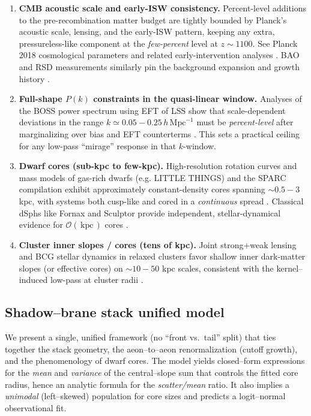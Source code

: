 \documentclass[10pt]{article}
\theoremstyle{definition}
\theoremstyle{plain}
\begin{document}
\begin{enumerate}[leftmargin=1.4em,itemsep=2pt]
\item \textbf{CMB acoustic scale and early-ISW consistency.}
Percent-level additions to the pre-recombination matter budget are tightly bounded by
Planck’s acoustic scale, lensing, and the early-ISW pattern, keeping any extra,
pressureless-like component at the \emph{few-percent} level at $z\!\sim\!1100$.
See Planck 2018 cosmological parameters \cite{Planck2018} and related early-intervention
analyses \cite{Poulin2019,Hill2020}. BAO and RSD measurements similarly pin the background
expansion and growth history \cite{Alam2021eBOSS}.

\item \textbf{Full-shape $P(k)$ constraints in the quasi-linear window.}
Analyses of the BOSS power spectrum using EFT of LSS show that
scale-dependent deviations in the range $k\simeq 0.05{-}0.25\,h\,\mathrm{Mpc}^{-1}$ must
be \emph{percent-level} after marginalizing over bias and EFT counterterms
\cite{Ivanov2020,DAmico2020}. This sets a practical ceiling for any low-pass “mirage”
response in that $k$-window.

\item \textbf{Dwarf cores (sub-kpc to few-kpc).}
High-resolution rotation curves and mass models of gas-rich dwarfs (e.g. LITTLE THINGS)
and the SPARC compilation exhibit approximately constant-density cores spanning
$\sim\!0.5{-}3$ kpc, with systems both cusp-like and cored in a \emph{continuous} spread
\cite{Oh2015,Lelli2016SPARC,Read2019}. Classical dSphs like Fornax and Sculptor provide
independent, stellar-dynamical evidence for $\mathcal{O}(\,\mathrm{kpc}\,)$ cores
\cite{WalkerPenarrubia2011}.

\item \textbf{Cluster inner slopes / cores (tens of kpc).}
Joint strong+weak lensing and BCG stellar dynamics in relaxed clusters favor shallow inner
dark-matter slopes (or effective cores) on $\sim\!10{-}50$ kpc scales, consistent with the
kernel–induced low-pass at cluster radii \cite{Newman2013I,Newman2013II}.
\end{enumerate}

\subsection{Shadow–brane stack unified model}
\label{subsec:stack-fit-unified}

We present a single, unified framework (no ``front vs.\ tail'' split) that ties together the stack geometry, the aeon–to–aeon renormalization (cutoff growth), and the phenomenology of dwarf cores. The model yields closed–form expressions for the \emph{mean} and \emph{variance} of the central–slope sum that controls the fitted core radius, hence an analytic formula for the \emph{scatter/mean} ratio. It also implies a \emph{unimodal} (left–skewed) population for core sizes and predicts a logit–normal observational fit.
\end{document}
